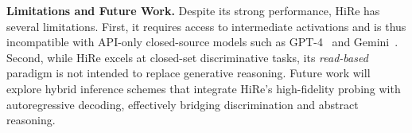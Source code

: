 \documentclass[sigconf,review,anonymous,9pt,table]{acmart}
\begin{document}
\noindent\textbf{Limitations and Future Work.}
Despite its strong performance, HiRe has several limitations.
First, it requires access to intermediate activations and is thus incompatible with API-only closed-source models such as GPT-4~\cite{achiam2023gpt} and Gemini~\cite{team2024gemini}.
Second, while HiRe excels at closed-set discriminative tasks, its \emph{read-based} paradigm is not intended to replace generative reasoning.
Future work will explore hybrid inference schemes that integrate HiRe's high-fidelity probing with autoregressive decoding, effectively bridging discrimination and abstract reasoning.



\end{document}
